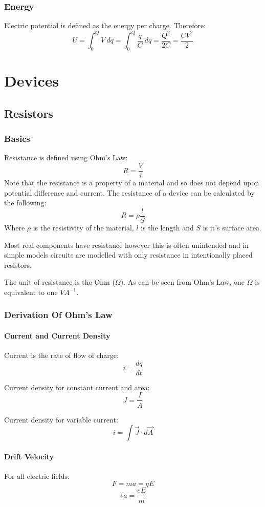 \documentclass[11pt,a4paper]{report}
\begin{document}
\subsection{Energy}
Electric potential is defined as the energy per charge. Therefore:
\begin{equation*}
	U = \int_0^Q V \: dq = \int_0^Q \frac{q}{C} \: dq = \frac{Q^2}{2C} = \frac{CV^2}{2}
\end{equation*}

\chapter{Devices}
\section{Resistors}
\subsection{Basics}
Resistance is defined using Ohm's Law:
\[R=\frac{V}{i}\] Note that the resistance is a property of a material and so does not depend upon potential difference and current. The resistance of a device can be calculated by the following:
\[R=\rho\frac{l}{S}\] Where $\rho$ is the resistivity of the material, $l$ is the length and $S$ is it's surface area.

Most real components have resistance however this is often unintended and in simple models circuits are modelled with only resistance in intentionally placed resistors.

The unit of resistance is the Ohm ($\Omega$). As can be seen from Ohm's Law, one $\Omega$ is equivalent to one $VA^{-1}$.

\subsection{Derivation Of Ohm's Law}
\subsubsection{Current and Current Density}
Current is the rate of flow of charge:
\[i=\frac{dq}{dt}\]

Current density for constant current and area: 
\[J = \frac{I}{A}\]

Current density for variable current: 
\[i = \int \vec{J} \cdot d\vec{A}\] 

\subsubsection{Drift Velocity}
For all electric fields:
\[F = ma = qE\]
\[\therefore a = \frac{eE}{m}\]
\end{document}
